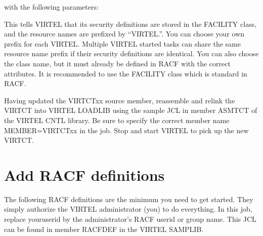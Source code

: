 \documentclass[letterpaper,10pt,english]{sphinxmanual}
\begin{document}
with the following parameters:

\begin{sphinxVerbatim}[commandchars=\\\{\}]
\end{sphinxVerbatim}

This tells VIRTEL that its security definitions are stored in the FACILITY class, and the resource names are prefixed by “VIRTEL.”. You can choose your own prefix for each VIRTEL. Multiple VIRTEL started tasks can share the same resource name prefix if their security definitions are identical. You can also choose the class name, but it must already be defined in RACF with the correct attributes. It is recommended to use the FACILITY class which is standard in RACF.

Having updated the VIRTCTxx source member, reassemble and relink the VIRTCT into VIRTEL LOADLIB using the sample JCL in member ASMTCT of the VIRTEL CNTL library. Be sure to specify the correct member name MEMBER=VIRTCTxx in the job. Stop and start VIRTEL to pick up the new VIRTCT.

\newpage

\ignorespaces 

\section{Add RACF definitions}
\label{\detokenize{Installation_Guide:add-racf-definitions}}\label{\detokenize{Installation_Guide:index-180}}
The following RACF definitions are the minimum you need to get started. They simply authorize the VIRTEL administrator (you) to do everything. In this job, replace youruserid by the administrator’s RACF userid or group name. This JCL can be found in member RACFDEF in the VIRTEL SAMPLIB.
\end{document}
